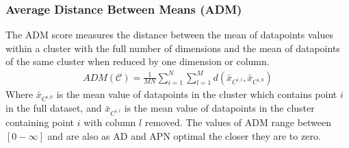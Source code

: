 \subsubsection{Average Distance Between Means (ADM)}
The ADM  score measures  the distance between  the mean  of datapoints
values within  a cluster  with the full  number of dimensions  and the
mean of datapoints  of the same cluster when  reduced by one dimension
or column.
\begin{gather}
ADM(\mathcal{C})= \frac{1}{MN} \sum_{i=1}^{N} \sum_{l=1}^{M}
d(\bar{x}_{C^{i,l}}, \bar{x}_{C^{i,0}})
\end{gather}  
Where  $\bar{x}_{C^{i,0}}$ is  the  mean value  of  datapoints in  the
cluster   which  contains  point   $i$  in   the  full   dataset,  and
$\bar{x}_{C^{i,l}}$  is the mean  value of  datapoints in  the cluster
containing point $i$ with column $l$ removed.  The values of ADM range
between $[0-\infty]$  and are  also as AD  and APN optimal  the closer
they are to zero.






